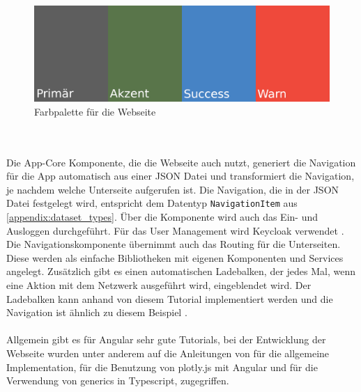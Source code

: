 \begin{figure}[h!]
\centering
\includegraphics[scale=0.6]{gfx/palette.png}
\caption{Farbpalette für die Webseite}
\label{fig:palette}
\end{figure}
\\\\Die App-Core Komponente, die die Webseite auch nutzt, generiert die Navigation für die App automatisch aus einer JSON Datei und transformiert die Navigation, je nachdem welche Unterseite aufgerufen ist. Die Navigation, die in der JSON Datei festgelegt wird, entspricht dem Datentyp \texttt{NavigationItem} aus \ref{appendix:dataset_types}. Über die Komponente wird auch das Ein- und Ausloggen durchgeführt. Für das User Management wird Keycloak verwendet \cite{KeycloakAuthorsTheLinuxFoundation.2023}. Die Navigationskomponente übernimmt auch das Routing für die Unterseiten. Diese werden als einfache Bibliotheken mit eigenen Komponenten und Services angelegt. Zusätzlich gibt es einen automatischen Ladebalken, der jedes Mal, wenn eine Aktion mit dem Netzwerk ausgeführt wird, eingeblendet wird. Der Ladebalken kann anhand von diesem Tutorial implementiert werden \cite{KeithStrickland.2020} und die Navigation ist ähnlich zu diesem Beispiel \cite{sahilshah.2023}.
\\\\ 
Allgemein gibt es für Angular sehr gute Tutorials, bei der Entwicklung der Webseite wurden unter anderem auf die Anleitungen von \cite{Angular.2022} für die allgemeine Implementation, \cite{DavidAkim.2022} für die Benutzung von plotly.js mit Angular und \cite{JonathanCardoso.2021} für die Verwendung von generics in Typescript, zugegriffen.
